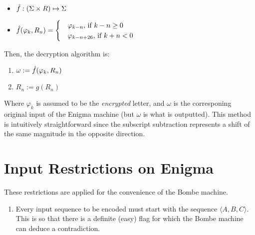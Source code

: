 \documentclass[12pt,a4paper]{article}
\begin{document}
	 \begin{itemize}
		\item $\hat{f}: (\Sigma \times R) \mapsto \Sigma$ 
		\item $\hat{f}(\varphi_k, R_n)= 					
					\begin{cases} 
						&\varphi_{k-n} \text{, if } {k-n} \geq 0 \\
						&\varphi_{k-n+26} \text{, if }{k+n} < 0
					\end{cases}
			  $ 
	\end{itemize}

	Then, the decryption algorithm is:
	

	\begin{enumerate}
		\item $\omega := \hat{f}(\varphi_k, R_n)$
		\item $R_n := g(R_n)$
	\end{enumerate}

	Where $\varphi_k$ is assumed to be the \emph{encrypted} letter, and $\omega$ is the corresponing original input of the Enigma machine (but $\omega$ is what is outputted). This method is intuitively straightforward since the subscript subtraction represents a shift of the same magnitude in the opposite direction. \\

	

	\section{Input Restrictions on Enigma}
	These restrictions are applied for the convenience of the Bombe machine.

	\begin{enumerate}
		\item Every input sequence to be encoded must start with the sequence $\langle A, B, C \rangle$.
		This is so that there is a definite (easy) flag for which the Bombe machine can deduce a contradiction.
	\end{enumerate}
\end{document}
